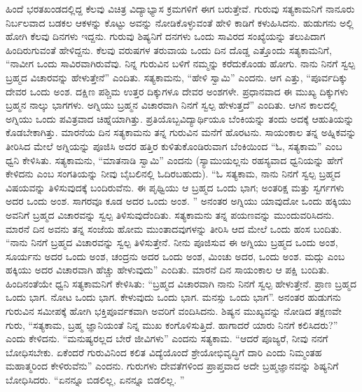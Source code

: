 \vskip 5pt

ಹಿಂದೆ ಭರತಖಂಡದಲ್ಲಿದ್ದ ಕೆಲವು ವಿಚಿತ್ರ ವಿದ್ಯಾಭ್ಯಾಸ ಕ್ರಮಗಳಿಗೆ ಈಗ ಬರುತ್ತೇವೆ. ಗುರುವು ಸತ್ಯಕಾಮನಿಗೆ ನಾನೂರು ನಿರ್ಬಲವಾದ ಬಡಕಲ ಆಕಳನ್ನು ಕೊಟ್ಟು ಅವನ್ನು ನೋಡಿಕೊಳ್ಳುವಂತೆ ಹೇಳಿ ಕಾಡಿಗೆ ಕಳುಹಿಸಿದನು. ಹುಡುಗನು ಅಲ್ಲಿ ಹೋಗಿ ಕೆಲವು ದಿನಗಳು ಇದ್ದನು. ಗುರುವು ಶಿಷ್ಯನಿಗೆ ದನಗಳು ಒಂದು ಸಾವಿರದ ಸಂಖ್ಯೆಯನ್ನು ತಲುಪಿದಾಗ ಹಿಂದಿರುಗುವಂತೆ ಹೇಳಿದ್ದನು. ಕೆಲವು ವರುಷಗಳ ತರುವಾಯ ಒಂದು ದಿನ ದೊಡ್ಡ ಎತ್ತೊಂದು ಸತ್ಯಕಾಮನಿಗೆ, “ನಾವೀಗ ಒಂದು ಸಾವಿರವಾಗಿರುವೆವು. ನಿನ್ನ ಗುರುವಿನ ಬಳಿಗೆ ನಮ್ಮನ್ನು ಕರೆದುಕೊಂಡು ಹೋಗು. ನಾನು ನಿನಗೆ ಸ್ವಲ್ಪ ಬ್ರಹ್ಮದ ವಿಚಾರವನ್ನು ಹೇಳುತ್ತೇನೆ” ಎಂದಿತು. ಸತ್ಯಕಾಮನು, “ಹೇಳಿ ಸ್ವಾಮಿ” ಎಂದನು. ಆಗ ಎತ್ತು, “ಪೂರ್ವದಿಕ್ಕು ದೇವರ ಒಂದು ಅಂಶ. ದಕ್ಷಿಣ ಪಶ್ಚಿಮ ಉತ್ತರ ದಿಕ್ಕುಗಳೂ ದೇವರ ಅಂಶಗಳೇ. ಪ್ರಧಾನವಾದ ಈ ಮುಖ್ಯ ದಿಕ್ಕುಗಳು ಬ್ರಹ್ಮನ ನಾಲ್ಕು ಭಾಗಗಳು. ಅಗ್ನಿಯು ಬ್ರಹ್ಮನ ವಿಚಾರವಾಗಿ ನಿನಗೆ ಸ್ವಲ್ಪ ಹೇಳುತ್ತದೆ” ಎಂದಿತು. ಆಗಿನ ಕಾಲದಲ್ಲಿ ಅಗ್ನಿಯು ಒಂದು ಪವಿತ್ರವಾದ ಚಿಹ್ನೆಯಾಗಿತ್ತು. ಪ್ರತಿಯೊಬ್ಬವಿದ್ಯಾರ್ಥಿಯೂ ಬೆಂಕಿಯನ್ನು ತಂದು ಅದಕ್ಕೆ ಆಹುತಿಯನ್ನು ಕೊಡಬೇಕಾಗಿತ್ತು. ಮಾರನೆಯ ದಿನ ಸತ್ಯಕಾಮನು ತನ್ನ ಗುರುವಿನ ಮನೆಗೆ ಹೊರಟನು. ಸಾಯಂಕಾಲ ತನ್ನ ಅಹ್ನಿಕವನ್ನು ತೀರಿಸಿದ ಮೇಲೆ ಅಗ್ನಿಯನ್ನು ಪೂಜಿಸಿ ಅದರ ಹತ್ತಿರ ಕುಳಿತುಕೊಂಡಿರುವಾಗ ಬೆಂಕಿಯಿಂದ “ಓ, ಸತ್ಯಕಾಮ” ಎಂಬ ಧ್ವನಿ ಕೇಳಿಸಿತು. ಸತ್ಯಕಾಮನು, “ಮಾತನಾಡಿ ಸ್ವಾಮಿ” ಎಂದನು (ಸ್ಯಾಮುಯಲ್ಲನು ರಹಸ್ಯವಾದ ಧ್ವನಿಯನ್ನು ಹೇಗೆ ಕೇಳಿದನು ಎಂಬ ಸಂಗತಿಯನ್ನು ನೀವು ಬೈಬಲಿನಲ್ಲಿ ಓದಿರಬಹುದು). “ಓ ಸತ್ಯಕಾಮ, ನಾನು ನಿನಗೆ ಸ್ವಲ್ಪ ಬ್ರಹ್ಮದ ವಿಷಯವನ್ನು ತಿಳಿಸುವುದಕ್ಕೆ ಬಂದಿರುವೆನು. ಈ ಪೃಥ್ವಿಯು ಆ ಬ್ರಹ್ಮದ ಒಂದು ಭಾಗ; ಅಂತರಿಕ್ಷ ಮತ್ತು ಸ್ವರ್ಗಗಳು ಅದರ ಒಂದು ಅಂಶ. ಸಾಗರವೂ ಕೂಡ ಅದರ ಒಂದು ಅಂಶ. ” ಅನಂತರ ಅಗ್ನಿಯು ಯಾವುದೋ ಒಂದು ಹಕ್ಕಿಯು ಅವನಿಗೆ ಬ್ರಹ್ಮದ ವಿಚಾರವನ್ನು ಸ್ವಲ್ಪ ತಿಳಿಸುವುದೆಂದಿತು. ಸತ್ಯಕಾಮನು ತನ್ನ ಪಯಣವನ್ನು ಮುಂದುವರಿಸಿದನು. ಮಾರನೆ ದಿನ ಅವನು ತನ್ನ ಸಂಜೆಯ ಹೋಮ ಮುಂತಾದವುಗಳನ್ನು ತೀರಿಸಿ ಆದ ಮೇಲೆ ಒಂದು ಹಂಸ ಬಂದಿತು. “ನಾನು ನಿನಗೆ ಬ್ರಹ್ಮದ ವಿಚಾರವನ್ನು ಸ್ವಲ್ಪ ತಿಳಿಸುತ್ತೇನೆ. ನೀನು ಪೂಜಿಸುವ ಈ ಅಗ್ನಿಯು ಬ್ರಹ್ಮದ ಒಂದು ಅಂಶ, ಸೂರ್ಯನು ಅದರ ಒಂದು ಅಂಶ, ಚಂದ್ರನು ಅದರ ಒಂದು ಅಂಶ, ಮಿಂಚು ಅದರ, ಒಂದು ಅಂಶ. ಮದ್ಗು ಎಂಬ ಹಕ್ಕಿಯು ಅದರ ವಿಚಾರವಾಗಿ ಹೆಚ್ಚು ಹೇಳುವುದು” ಎಂದಿತು. ಮಾರನೆ ದಿನ ಸಾಯಂಕಾಲ ಆ ಪಕ್ಷಿ ಬಂದಿತು. ಹಿಂದಿನಂತೆಯೇ ಧ್ವನಿ ಸತ್ಯಕಾಮನಿಗೆ ಕೇಳಿಸಿತು: “ಬ್ರಹ್ಮದ ವಿಚಾರವಾಗಿ ನಾನು ನಿನಗೆ ಸ್ವಲ್ಪ ಹೇಳುತ್ತೇನೆ. ಪ್ರಾಣ ಬ್ರಹ್ಮದ ಒಂದು ಭಾಗ. ನೋಟ ಒಂದು ಭಾಗ. ಕೇಳುವುದು ಒಂದು ಭಾಗ. ಮನಸ್ಸು ಒಂದು ಭಾಗ”. ಅನಂತರ ಹುಡುಗನು ಗುರುವಿನ ಸಮೀಪಕ್ಕೆ ಹೋಗಿ ಭಕ್ತಿಪೂರ್ವಕವಾಗಿ ಅವರಿಗೆ ವಂದಿಸಿದನು. ಶಿಷ್ಯನ ಮುಖ್ಯವನ್ನು ನೋಡಿದ ತಕ್ಷಣವೇ ಗುರು, “ಸತ್ಯಕಾಮ, ಬ್ರಹ್ಮ ಜ್ಞಾನಿಯಂತೆ ನಿನ್ನ ಮುಖ ಕಂಗೊಳಿಸುತ್ತಿದೆ. ಹಾಗಾದರೆ ಯಾರು ನಿನಗೆ ಕಲಿಸಿದರು?” ಎಂದು ಕೇಳಿದನು. “ಮನುಷ್ಯರಲ್ಲದ ಬೇರೆ ಜೀವಿಗಳು” ಎಂದನು ಸತ್ಯಕಾಮ. “ಆದರೆ ಪೂಜ್ಯರೆ, ನೀವು ನನಗೆ ಬೋಧಿಸಬೇಕು. ಏಕೆಂದರೆ ಗುರುವಿನಿಂದ ಕಲಿತ ವಿದ್ಯೆಯೊಂದೆ ಶ್ರೇಯೋಭಿವೃದ್ಧಿಗೆ ದಾರಿ ಎಂದು ನಿಮ್ಮಂತಹ ಮಹಾತ್ಮರಿಂದ ಕೇಳಿರುವೆನು” ಎಂದನು. ಗುರುಗಳು ದೇವತೆಗಳಿಂದ ಪ್ರಾಪ್ತವಾದ ಅದೇ ಬ್ರಹ್ಮಜ್ಞಾನವನ್ನು ಶಿಷ್ಯನಿಗೆ ಬೋಧಿಸಿದರು. “ಏನನ್ನೂ ಬಿಡಲಿಲ್ಲ, ಏನನ್ನೂ ಬಿಡಲಿಲ್ಲ. ”

\vskip 5pt

